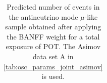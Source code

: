 \begin{table}
\begin{tabular} { | l ||r | r | r | r | r | r | | r | }
\end{tabular}
\caption{
Predicted number of events in the antineutrino mode $\mu$-like sample
obtained after applying the BANFF weight
for a total exposure of \TotalPotNuBarRunOneSevenB{} POT.
The Asimov data set A in \cref{tab:osc_params_joint_asimov} is used.
}
\label{tab:events_rhc1rmu_Asimov_A_Run17b}
\end{table}


